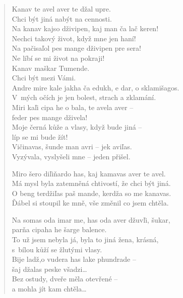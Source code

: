 \begin{verse}
Kanav te avel aver te džal upre. \\
Chci být jiná nabýt na cennosti. \\
Na kanav kajso dživipen, kaj man ča lač keren! \\
Nechci takový život, když mne jen haní! \\
Na pačisaľol pes mange dživipen pre sera! \\
Ne líbí se mi život na pokraji! \\
Kanav maškar Tumende. \\
Chci být mezi Vámi. \\
Andre mire kale jakha ča edukh, e dar, o sklamišagos. \\
V mých očích je jen bolest, strach a zklamání. \\
Miri kaľi cipa he o bala, te avela aver -- \\
\hspace{\fill}feder pes mange dživela! \\
Moje černá kůže a vlasy, když bude jiná – \\
\hspace{\fill}líp se mi bude žít! \\
Vičinavas, šunde man avri – jek aviľas. \\
Vyzývala, vyslyšeli mne -- jeden přišel.

\medskip

Miro šero diľiňardo has, kaj kamavas aver te avel. \\
Má mysl byla zatemněná chtivostí, že chci být jiná. \\
O beng terdžiľas paš mande, kerdža so me kanavas. \\
Ďábel si stoupil ke mně, vše změnil co jsem chtěla.

\medskip

Na somas oda imar me, has oda aver džuvľi, šukar, \\
\hspace{\fill}parňa cipaha he šarge balence. \\
To už jsem nebyla já, byla to jiná žena, krásná, \\
\hspace{\fill}s bílou kůží se žlutými vlasy. \\
Bije ladž,o vudera has lake phundrade -- \\
\hspace{\fill}šaj džalas peske všadzi\ldots \\
Bez ostudy, dveře měla otevřené – \\
\hspace{\fill}a  mohla jít kam chtěla\ldots 


\end{verse}
